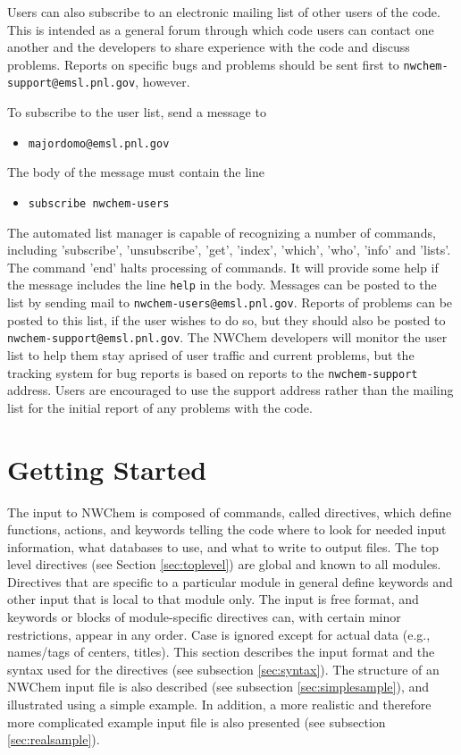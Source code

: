 Users can also subscribe to an electronic mailing list of other users of
 the code.  This is intended as a general forum through which code users 
can contact one another and the developers to share experience with the code
and discuss problems.  Reports on specific bugs and problems should 
be sent first to
{\tt nwchem-support@emsl.pnl.gov}, however.

To subscribe to the user list, send a message to 

\begin{itemize}
\item {\tt majordomo@emsl.pnl.gov}
\end{itemize}

The body of the message must contain the line 

\begin{itemize}
\item {\tt subscribe nwchem-users}
\end{itemize}

The automated list manager is capable of recognizing a number of commands, including
'subscribe', 'unsubscribe', 'get', 'index', 'which', 'who', 'info' and 
'lists'.  The command 'end' halts processing of commands.  It will provide
some help if the message includes the line {\tt help} in the body.  Messages
can be posted to the list by
sending mail to {\tt nwchem-users@emsl.pnl.gov}.  Reports of problems can
be posted to this list, if the user wishes to do so, but they should also
be posted to {\tt nwchem-support@emsl.pnl.gov}.  The NWChem developers
will monitor the user list to help them stay aprised of user traffic and
 current problems, but 
the tracking system for bug reports is based on reports to the
 {\tt nwchem-support} address.  Users are encouraged to use the support 
address rather than the mailing list for
the initial report of any problems with the code.

\section{Getting Started}
\label{sec:getstart}

The input to NWChem is composed of commands, called directives, which define 
functions, actions, and keywords telling the code where to look for needed
input information, what databases to use, and what to write to output files.
The top level directives (see Section \ref{sec:toplevel}) are global and 
known to all modules.
Directives that are specific to a particular module in general define keywords
and other input that is local to that module only.  
The input is free format, and
keywords or blocks of module-specific directives can, with certain
minor restrictions, appear in any order.  Case is ignored except
for actual data (e.g., names/tags of centers, titles).  This section describes
the input format and the syntax used for the directives 
(see subsection \ref{sec:syntax}).
The structure of an NWChem input file is also described (see subsection 
\ref{sec:simplesample}), and  illustrated using a simple example.  In 
addition, a  more realistic and therefore more complicated example input 
file is also presented (see subsection \ref{sec:realsample}).

